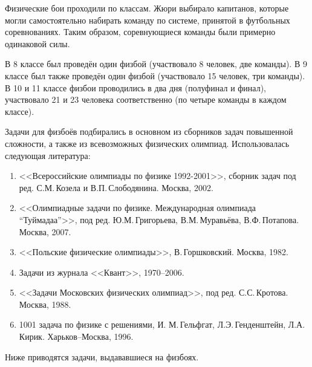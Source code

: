 \documentclass[12pt,a4paper,oneside]{scrartcl}
\newlength{\h}
\newlength{\x}
\begin{document}
Физические бои проходили по классам. Жюри выбирало капитанов, которые
могли самостоятельно набирать команду по системе, принятой в
футбольных соревнованиях. Таким образом, соревнующиеся команды были
примерно одинаковой силы.

В 8 классе был проведён один физбой (участвовало 8 человек, две
команды). В 9 классе был также проведён один физбой (участвовало 15
человек, три команды). В 10 и 11 классе физбои проводились в два дня
(полуфинал и финал), участвовало 21 и 23 человека соответственно
(по четыре команды в каждом классе). 

\begin{figure}[h]
  \centering
  \hspace{0.05\textwidth}
\end{figure}

Задачи для физбоёв подбирались в основном из сборников задач повышенной
сложности, а также из всевозможных физических олимпиад. Использовалась
следующая литература: 

\begin{enumerate}
\item <<Всероссийские олимпиады по физике 1992-2001>>, сборник задач
  под ред. С.М.\,Ко\-зе\-ла и В.П.\,Слободянина. Москва, 2002.
\item <<Олимпиадные задачи по физике. Международная олимпиада
  ``Туймадаа''>>, под ред. Ю.М.\,Григорьева, В.М.\,Муравьёва,
  В.Ф.\,Потапова. Москва, 2007.
\item <<Польские физические олимпиады>>, В.\,Горшковский. Москва,
  1982.
\item Задачи из журнала <<Квант>>, 1970--2006. 
\item <<Задачи Московских физических олимпиад>>, под ред.
  С.С.\,Кротова. Москва, 1988.
\item 1001 задача по физике с решениями, И. М.\,Гельфгат, 
  Л.Э.\,Генденштейн, Л.А.\,Кирик. Харьков--Москва, 1996.
\end{enumerate}

Ниже приводятся задачи, выдававшиеся на физбоях. 







\end{document}
